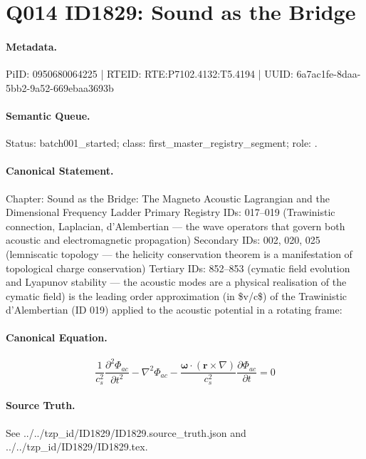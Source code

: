 \section*{Q014 ID1829: Sound as the Bridge}
\paragraph{Metadata.}
PiID: 0950680064225 | RTEID: RTE:P7102.4132:T5.4194 | UUID: 6a7ac1fe-8daa-5bb2-9a52-669ebaa3693b

\paragraph{Semantic Queue.}
Status: batch001\_started; class: first\_master\_registry\_segment; role: .

\paragraph{Canonical Statement.}
Chapter: Sound as the Bridge: The Magneto Acoustic Lagrangian and the Dimensional Frequency Ladder Primary Registry IDs: 017–019 (Trawinistic connection, Laplacian, d'Alembertian — the wave operators that govern both acoustic and electromagnetic propagation) Secondary IDs: 002, 020, 025 (lemniscatic topology — the helicity conservation theorem is a manifestation of topological charge conservation) Tertiary IDs: 852–853 (cymatic field evolution and Lyapunov stability — the acoustic modes are a physical realisation of the cymatic field) is the leading order approximation (in \$v/c\$) of the Trawinistic d'Alembertian (ID 019) applied to the acoustic potential in a rotating frame:

\paragraph{Canonical Equation.}
\[
\frac{1}{c_s^2}\frac{\partial^2\Phi_{ac}}{\partial t^2} - \nabla^2\Phi_{ac} - \frac{\boldsymbol{\omega}\cdot(\mathbf{r}\times\nabla)}{c_s^2}\frac{\partial\Phi_{ac}}{\partial t} = 0
\]

\paragraph{Source Truth.}
See ../../tzp\_id/ID1829/ID1829.source\_truth.json and ../../tzp\_id/ID1829/ID1829.tex.
